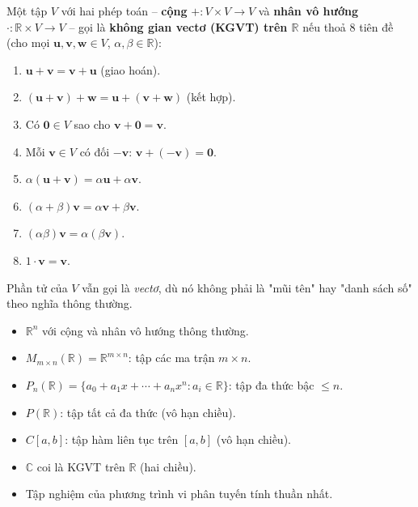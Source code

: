 \documentclass[12pt,a4paper]{article}
\begin{document}
\begin{dinhnghia}
  Một tập $V$ với hai phép toán -- \textbf{cộng} $+: V \times V \to V$ và \textbf{nhân vô hướng} $\cdot : \mathbb{R} \times V \to V$ -- gọi là \textbf{không gian vectơ (KGVT) trên $\mathbb{R}$} nếu thoả 8 tiên đề (cho mọi $\mathbf{u}, \mathbf{v}, \mathbf{w} \in V$, $\alpha, \beta \in \mathbb{R}$):
  \begin{enumerate}[itemsep=0pt]
    \item $\mathbf{u}+\mathbf{v} = \mathbf{v}+\mathbf{u}$ (giao hoán).
    \item $(\mathbf{u}+\mathbf{v})+\mathbf{w} = \mathbf{u}+(\mathbf{v}+\mathbf{w})$ (kết hợp).
    \item Có $\mathbf{0} \in V$ sao cho $\mathbf{v}+\mathbf{0}=\mathbf{v}$.
    \item Mỗi $\mathbf{v} \in V$ có đối $-\mathbf{v}$: $\mathbf{v} + (-\mathbf{v}) = \mathbf{0}$.
    \item $\alpha(\mathbf{u}+\mathbf{v}) = \alpha\mathbf{u} + \alpha\mathbf{v}$.
    \item $(\alpha+\beta)\mathbf{v} = \alpha\mathbf{v} + \beta\mathbf{v}$.
    \item $(\alpha\beta)\mathbf{v} = \alpha(\beta\mathbf{v})$.
    \item $1 \cdot \mathbf{v} = \mathbf{v}$.
  \end{enumerate}
  Phần tử của $V$ vẫn gọi là \emph{vectơ}, dù nó không phải là "mũi tên" hay "danh sách số" theo nghĩa thông thường.
\end{dinhnghia}

\begin{vidu}[title={Các KGVT quan trọng}]
\begin{itemize}
  \item $\mathbb{R}^n$ với cộng và nhân vô hướng thông thường.
  \item $M_{m\times n}(\mathbb{R}) = \mathbb{R}^{m\times n}$: tập các ma trận $m\times n$.
  \item $P_n(\mathbb{R}) = \{a_0 + a_1 x + \cdots + a_n x^n : a_i \in \mathbb{R}\}$: tập đa thức bậc $\le n$.
  \item $P(\mathbb{R})$: tập tất cả đa thức (vô hạn chiều).
  \item $C[a,b]$: tập hàm liên tục trên $[a,b]$ (vô hạn chiều).
  \item $\mathbb{C}$ coi là KGVT trên $\mathbb{R}$ (hai chiều).
  \item Tập nghiệm của phương trình vi phân tuyến tính thuần nhất.
\end{itemize}
\end{vidu}
\end{document}
